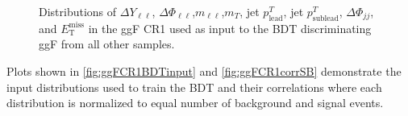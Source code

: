 \begin{figure}[!h]
{  }\hfill
  \hfill
{\caption{Distributions of $\Delta Y_{\ell\ell}$, $\Delta \Phi_{\ell\ell}$,$m_{\ell\ell}$,$m_T$, jet $p^T_{\text{lead}}$, jet $p^T_{\text{sublead}}$, $\Delta \Phi_{jj}$, and $\ensuremath{E_{\text{T}}^{\text{miss}}}$ in the ggF CR1 used as input to the BDT discriminating ggF from all other samples.
\label{fig:ggFCR1}}}
\end{figure} 

Plots shown in \ref{fig:ggFCR1BDTinput} and \ref{fig:ggFCR1corrSB} demonstrate the input distributions used to train the BDT and their correlations where each distribution is normalized to equal number of background and signal events. 

